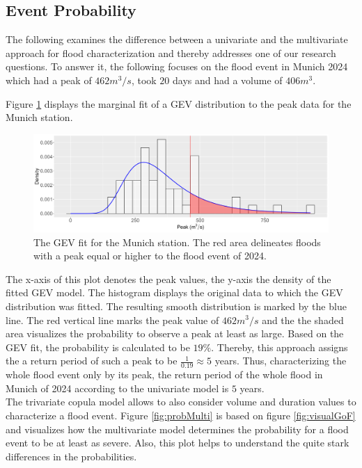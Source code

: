 \documentclass[
]{krantz}
\begin{document}
\subsection{Event Probability}\label{event-probability}

The following examines the difference between a univariate and the multivariate approach
for flood characterization and thereby addresses one of our research questions.
To answer it, the
following focuses on the flood event in Munich 2024
which had a peak of \(462m^3/s\), took \(20\) days and had a volume of \(406m^3\).

Figure \ref{fig:probUni} displays the marginal fit of a GEV distribution to the peak data for the Munich station.

\begin{figure}

{\centering \includegraphics[width=0.5\linewidth]{work/04-floodfreq/figures/app_univariate_hq} 

}

\caption{The GEV fit for the Munich station. The red area delineates floods with a peak equal or higher to the flood event of 2024.}\label{fig:probUni}
\end{figure}

The x-axis of this plot denotes the peak values, the y-axis the density of the fitted GEV model.
The histogram displays the original data to which the GEV distribution was fitted. The resulting smooth distribution
is marked by the blue line. The red vertical line marks the peak value of \(462m^3/s\) and
the the shaded area visualizes the probability
to observe a peak at least as large. Based on the GEV fit, the probability is calculated to be
\(19\%\). Thereby, this approach assigns the a
return period of such a peak to be \(\frac{1}{0.19} \approx5\) years.
Thus, characterizing the whole flood event only by its peak,
the return period of the whole flood in Munich of 2024 according to the univariate model is \(5\) years.\\
The trivariate copula model allows to also consider volume and duration values to characterize a flood event.
Figure \ref{fig:probMulti} is based on figure \ref{fig:visualGoF} and visualizes
how the multivariate model determines the probability for a flood event to be at least as severe.
Also, this plot helps to understand the quite stark differences in the probabilities.
\end{document}
